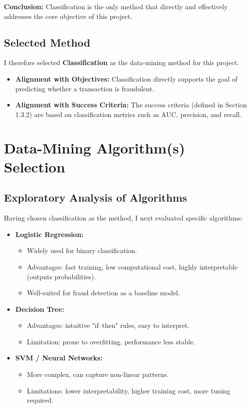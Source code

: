 \documentclass[sigplan,screen]{acmart}
\begin{document}
\textbf{Conclusion:} Classification is the only method that directly and effectively addresses the core objective of this project.

\subsection{Selected Method}

I therefore selected \textbf{Classification} as the data-mining method for this project.

\begin{itemize}
    \item \textbf{Alignment with Objectives:} Classification directly supports the goal of predicting whether a transaction is fraudulent.
    \item \textbf{Alignment with Success Criteria:} The success criteria (defined in Section 1.3.2) are based on classification metrics such as AUC, precision, and recall.
\end{itemize}

\section{Data-Mining Algorithm(s) Selection}

\subsection{Exploratory Analysis of Algorithms}

Having chosen classification as the method, I next evaluated specific algorithms:

\begin{itemize}
    \item \textbf{Logistic Regression:}
    \begin{itemize}
        \item Widely used for binary classification.
        \item Advantages: fast training, low computational cost, highly interpretable (outputs probabilities).
        \item Well-suited for fraud detection as a baseline model.
    \end{itemize}
    
    \item \textbf{Decision Tree:}
    \begin{itemize}
        \item Advantages: intuitive "if--then" rules, easy to interpret.
        \item Limitation: prone to overfitting, performance less stable.
    \end{itemize}
    
    \item \textbf{SVM / Neural Networks:}
    \begin{itemize}
        \item More complex, can capture non-linear patterns.
        \item Limitations: lower interpretability, higher training cost, more tuning required.
    \end{itemize}
\end{itemize}
\end{document}
